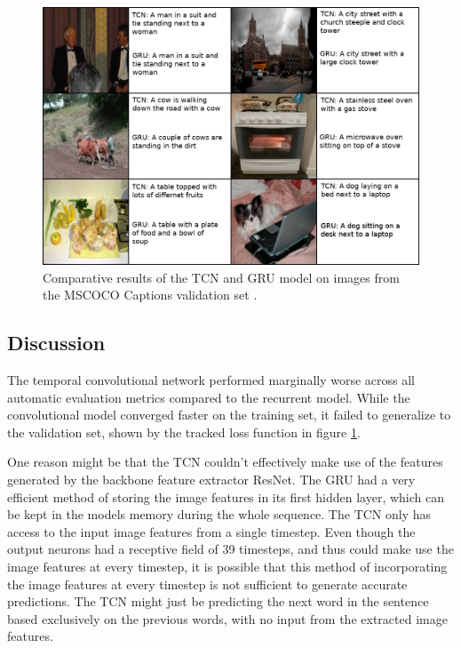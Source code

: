 \documentclass[a4paper, twoside]{article}
\begin{document}
\begin{figure}[h]
\begin{center}
    \includegraphics[width=15cm]{captionsbig.png}\caption{Comparative results of the TCN and GRU model on images from the MSCOCO Captions validation set \cite{mscoco}.} \label{figimagecaptioning}
\end{center}
\end{figure}

\subsection{Discussion}
The temporal convolutional network performed marginally worse across all automatic evaluation metrics compared to the recurrent model. While the convolutional model converged faster on the training set, it failed to generalize to the validation set, shown by the tracked loss function in figure \ref{figimagecaptioning}.

One reason might be that the TCN couldn't effectively make use of the features generated by the backbone feature extractor ResNet. The GRU had a very efficient method of storing the image features in its first hidden layer, which can be kept in the models memory during the whole sequence. The TCN only has access to the input image features from a single timestep. Even though the output neurons had a receptive field of 39 timesteps, and thus could make use the image features at every timestep, it is possible that this method of incorporating the image features at every timestep is not sufficient to generate accurate predictions. The TCN might just be predicting the next word in the sentence based exclusively on the previous words, with no input from the extracted image features.
\end{document}
